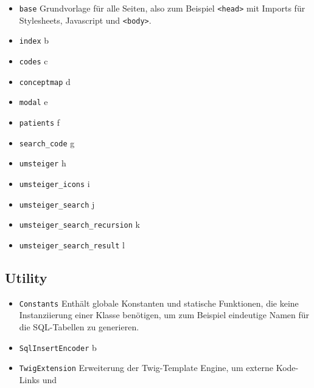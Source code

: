 \begin{itemize}
\item \texttt{base} \newline Grundvorlage für alle Seiten, also zum Beispiel \texttt{<head>} mit Imports für Stylesheets, Javascript und \texttt{<body>}.
\item \texttt{index} \newline b
\item \texttt{codes} \newline c
\item \texttt{conceptmap} \newline d
\item \texttt{modal} \newline e
\item \texttt{patients} \newline f
\item \texttt{search\_code} \newline g
\item \texttt{umsteiger} \newline h
\item \texttt{umsteiger\_icons} \newline i
\item \texttt{umsteiger\_search} \newline j
\item \texttt{umsteiger\_search\_recursion} \newline k
\item \texttt{umsteiger\_search\_result} \newline l
\end{itemize}

\subsection{Utility}

\begin{itemize}
\item \texttt{Constants} \newline Enthält globale Konstanten und statische Funktionen, die keine Instanziierung einer Klasse benötigen, um zum Beispiel eindeutige Namen für die SQL-Tabellen zu generieren. 
\item \texttt{SqlInsertEncoder} \newline b
\item \texttt{TwigExtension} \newline Erweiterung der Twig-Template Engine, um externe Kode-Links und 
\end{itemize}

